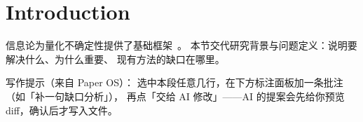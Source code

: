 \section{Introduction}

信息论为量化不确定性提供了基础框架~\cite{shannon1948}。
本节交代研究背景与问题定义：说明要解决什么、为什么重要、
现有方法的缺口在哪里。

写作提示（来自 Paper OS）：
选中本段任意几行，在下方标注面板加一条批注（如「补一句缺口分析」），
再点「交给 AI 修改」——AI 的提案会先给你预览 diff，确认后才写入文件。
